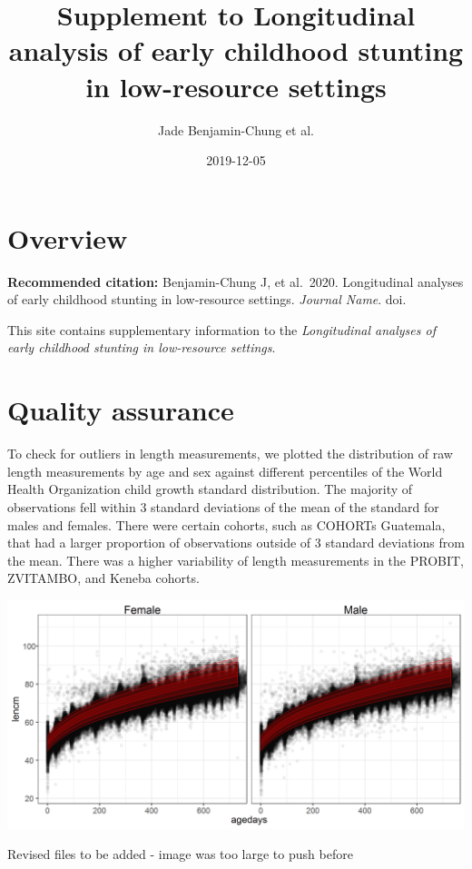 \documentclass[9pt,]{book}
\title{Supplement to Longitudinal analysis of early childhood stunting in low-resource settings}
\author{Jade Benjamin-Chung et al.}
\date{2019-12-05}
\begin{document}
\maketitle

{
\setcounter{tocdepth}{1}
\tableofcontents
}
\hypertarget{overview}{%
\chapter{Overview}\label{overview}}

\textbf{Recommended citation:} Benjamin-Chung J, et al.~2020. Longitudinal analyses of early childhood stunting in low-resource settings. \emph{Journal Name}. doi.

This site contains supplementary information to the \emph{Longitudinal analyses of early childhood stunting in low-resource settings}.

\hypertarget{QA}{%
\chapter{Quality assurance}\label{QA}}

\raggedright

To check for outliers in length measurements, we plotted the distribution of raw length measurements by age and sex against different percentiles of the World Health Organization child growth standard distribution. The majority of observations fell within 3 standard deviations of the mean of the standard for males and females. There were certain cohorts, such as COHORTs Guatemala, that had a larger proportion of observations outside of 3 standard deviations from the mean. There was a higher variability of length measurements in the PROBIT, ZVITAMBO, and Keneba cohorts.

\includegraphics[width=33.33in]{figure-copies/laz_QA}

Revised files to be added - image was too large to push before
\end{document}
